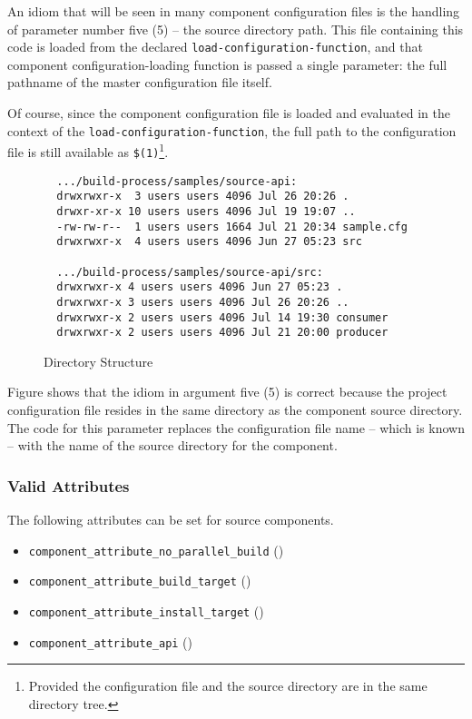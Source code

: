 An idiom that will be seen in many component configuration files is
the handling of parameter number five (5) -- the source directory
path.  This file containing this code is loaded from the declared
\texttt{load-configuration-function}, and that component
configuration-loading function is passed a single parameter: the full
pathname of the master configuration file itself.

Of course, since the component configuration file is loaded and
evaluated in the context of the \texttt{load-configuration-function},
the full path to the configuration file is still available as
\texttt{\$(1)}\footnote{Provided the configuration file and the source
  directory are in the same directory tree.}.

\begin{figure}
\hrulefill
\begin{small}
\begin{verbatim}
  .../build-process/samples/source-api:
  drwxrwxr-x  3 users users 4096 Jul 26 20:26 .
  drwxr-xr-x 10 users users 4096 Jul 19 19:07 ..
  -rw-rw-r--  1 users users 1664 Jul 21 20:34 sample.cfg
  drwxrwxr-x  4 users users 4096 Jun 27 05:23 src

  .../build-process/samples/source-api/src:
  drwxrwxr-x 4 users users 4096 Jun 27 05:23 .
  drwxrwxr-x 3 users users 4096 Jul 26 20:26 ..
  drwxrwxr-x 2 users users 4096 Jul 14 19:30 consumer
  drwxrwxr-x 2 users users 4096 Jul 21 20:00 producer
\end{verbatim}
\end{small}
\hrulefill
\caption{Directory Structure}\label{wrap:config-structure}
\end{figure}

Figure  shows that the idiom in argument
five (5) is correct because the project configuration file resides in
the same directory as the component source directory.  The code for
this parameter replaces the configuration file name -- which is known
-- with the name of the source directory for the component.

\subsubsection{Valid Attributes}

The following attributes can be set for source components.

\begin{itemize}
\item{\texttt{component\_attribute\_no\_parallel\_build}}
  ()
\item{\texttt{component\_attribute\_build\_target}}  ()
\item{\texttt{component\_attribute\_install\_target}} ()
\item{\texttt{component\_attribute\_api}} ()
\end{itemize}

